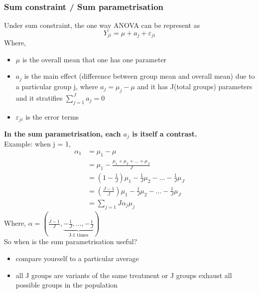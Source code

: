 \documentclass[12pt ]{article}
\begin{document}
\subsubsection{Sum constraint / Sum parametrisation}
Under sum constraint, the one way ANOVA can be represent as 
\begin{equation*}
Y_{ji} = \mu + a_{j} + \varepsilon_{ji}
\end{equation*}
Where,
\begin{itemize}
\item $\mu$ is the overall mean that one has one parameter 
\item $a_{j}$ is the main effect (difference between group mean and overall mean) due to a particular group j, where $a_{j}=\mu_{j}-\mu$ and it has J(total groups) parameters and it stratifies $\sum_{j=1}^{J} a_{j} = 0$
\item $ \varepsilon_{ji}$ is the error terms
\end{itemize}
\textbf{In the sum parametrisation, each $a_{j}$ is itself a contrast.} \\
Example: when j = 1,
\begin{align*}
\alpha_{1} &= \mu_{1} - \mu \\
&= \mu_{1} - \frac{\mu_{1} + \mu_{2} + \ldots + \mu_{J}}{J} \\
&= (1-\frac{1}{J}) \mu_{1} - \frac{1}{J} \mu_{2} - \ldots - \frac{1}{J} \mu_{J} \\
&= (\frac{J-1}{J}) \mu_{1} - \frac{1}{J} \mu_{2} - \ldots - \frac{1}{J} \mu_{J}  \\
&= \sum_{j=1}{J} \alpha_{j} \mu_{j}
\end{align*}
Where, $\alpha = (\frac{J-1}{J}, \underbrace{- \frac{1}{J}, \ldots, - \frac{1}{J}}_{\text{J-1 times}})$ \\
So when is the sum parametrisation useful? \\
\begin{itemize}
\item compare yourself to a particular average
\item all J groups are variants of the same treatment or J groups exhaust all possible groups in the population
\end{itemize}
\end{document}
